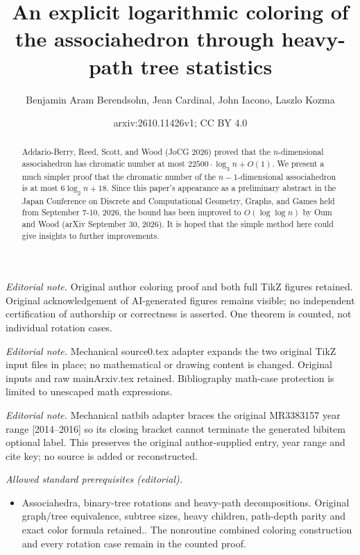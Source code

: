 \documentclass[10pt,a4paper]{article}
\title{An explicit logarithmic coloring of the associahedron through heavy-path tree statistics}
\author{Benjamin Aram Berendsohn, Jean Cardinal, John Iacono, Laszlo Kozma}
\date{arxiv:2610.11426v1; CC BY 4.0}
\begin{document}
\maketitle
\noindent\textit{Editorial note.} Original author coloring proof and both full TikZ figures retained. Original acknowledgement of AI-generated figures remains visible; no independent certification of authorship or correctness is asserted. One theorem is counted, not individual rotation cases.\par\medskip
\noindent\textit{Editorial note.} Mechanical source0.tex adapter expands the two original TikZ input files in place; no mathematical or drawing content is changed. Original inputs and raw mainArxiv.tex retained. Bibliography math-case protection is limited to unescaped math expressions.\par\medskip
\noindent\textit{Editorial note.} Mechanical natbib adapter braces the original MR3383157 year range [2014--2016] so its closing bracket cannot terminate the generated bibitem optional label. This preserves the original author-supplied entry, year range and cite key; no source is added or reconstructed.\par\medskip
\noindent\textit{Allowed standard prerequisites (editorial).}\begin{itemize}
\item Associahedra, binary-tree rotations and heavy-path decompositions. Original graph/tree equivalence, subtree sizes, heavy children, path-depth parity and exact color formula retained.. The nonroutine combined coloring construction and every rotation case remain in the counted proof.
\end{itemize}\medskip
\begin{abstract}
  Addario-Berry, Reed,  Scott, and Wood  (JoCG 2026) proved that the $n$-dimensional associahedron has chromatic number at most $22500\cdot\log_3 n+O(1)$. We present a much simpler proof that the chromatic number of the $n-1$-dimensional associahedron is at most $6 \log_2 n + 18$. Since this paper's appearance as a preliminary abstract in the Japan Conference on Discrete and Computational Geometry, Graphs, and Games held from September 7-10, 2026, the bound has been improved to $O(\log \log n)$ by Oum and Wood (arXiv September 30, 2026). It is hoped that the simple method here could give insights to further improvements.
\end{abstract}
\end{document}
